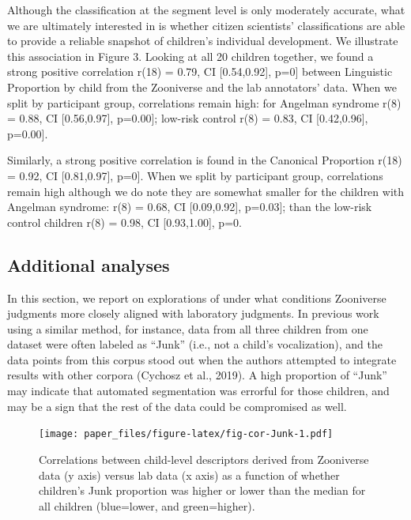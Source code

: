 \documentclass[english,,man]{apa6}
\begin{document}
Although the classification at the segment level is only moderately accurate, what we are ultimately interested in is whether citizen scientists' classifications are able to provide a reliable snapshot of children's individual development. We illustrate this association in Figure 3. Looking at all 20 children together, we found a strong positive correlation r(18) = 0.79, CI {[}0.54,0.92{]}, p=0{]} between Linguistic Proportion by child from the Zooniverse and the lab annotators' data. When we split by participant group, correlations remain high: for Angelman syndrome r(8) = 0.88, CI {[}0.56,0.97{]}, p=0.00{]}; low-risk control r(8) = 0.83, CI {[}0.42,0.96{]}, p=0.00{]}.

Similarly, a strong positive correlation is found in the Canonical Proportion r(18) = 0.92, CI {[}0.81,0.97{]}, p=0{]}. When we split by participant group, correlations remain high although we do note they are somewhat smaller for the children with Angelman syndrome: r(8) = 0.68, CI {[}0.09,0.92{]}, p=0.03{]}; than the low-risk control children r(8) = 0.98, CI {[}0.93,1.00{]}, p=0.

\hypertarget{additional-analyses}{%
\subsection{Additional analyses}\label{additional-analyses}}

In this section, we report on explorations of under what conditions Zooniverse judgments more closely aligned with laboratory judgments. In previous work using a similar method, for instance, data from all three children from one dataset were often labeled as \enquote{Junk} (i.e., not a child's vocalization), and the data points from this corpus stood out when the authors attempted to integrate results with other corpora (Cychosz et al., 2019). A high proportion of \enquote{Junk} may indicate that automated segmentation was errorful for those children, and may be a sign that the rest of the data could be compromised as well.

\begin{figure}
\centering
\texttt{[image: paper\_files/figure-latex/fig-cor-Junk-1.pdf]}
\caption{\label{fig:fig-cor-Junk}Correlations between child-level descriptors derived from Zooniverse data (y axis) versus lab data (x axis) as a function of whether children's Junk proportion was higher or lower than the median for all children (blue=lower, and green=higher).}
\end{figure}
\end{document}
